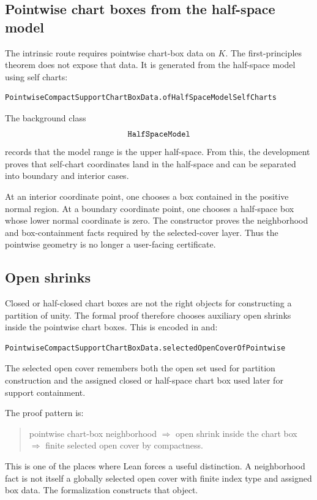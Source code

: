 \subsection{Pointwise chart boxes from the half-space model}

The intrinsic route requires pointwise chart-box data on \(K\).  The
first-principles theorem does not expose that data.  It is generated from the
half-space model using self charts:
\begin{lstlisting}[language=Lean]
PointwiseCompactSupportChartBoxData.ofHalfSpaceModelSelfCharts
\end{lstlisting}
The background class
\[
\code{HalfSpaceModel}
\]
records that the model range is the upper half-space.  From this, the
development proves that self-chart coordinates land in the half-space and can
be separated into boundary and interior cases.

At an interior coordinate point, one chooses a box contained in the positive
normal region.  At a boundary coordinate point, one chooses a half-space box
whose lower normal coordinate is zero.  The constructor proves the
neighborhood and box-containment facts required by the selected-cover layer.
Thus the pointwise geometry is no longer a user-facing certificate.

\subsection{Open shrinks}

Closed or half-closed chart boxes are not the right objects for constructing a
partition of unity.  The formal proof therefore chooses auxiliary open shrinks
inside the pointwise chart boxes.  This is encoded in
 and:
\begin{lstlisting}[language=Lean]
PointwiseCompactSupportChartBoxData.selectedOpenCoverOfPointwise
\end{lstlisting}
The selected open cover remembers both the open set used for partition
construction and the assigned closed or half-space chart box used later for
support containment.

The proof pattern is:
\begin{quote}
pointwise chart-box neighborhood \(\Rightarrow\) open shrink inside the chart
box \(\Rightarrow\) finite selected open cover by compactness.
\end{quote}
This is one of the places where Lean forces a useful distinction.  A
neighborhood fact is not itself a globally selected open cover with finite
index type and assigned box data.  The formalization constructs that object.

